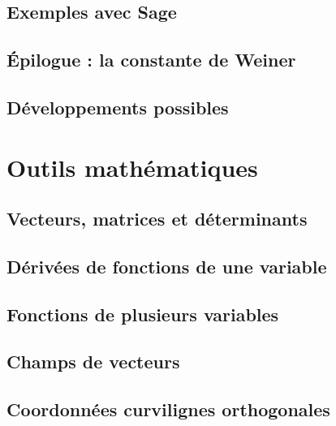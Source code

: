 \documentclass[a4paper,twoside,11pt]{book}
\begin{document}
\chapter{Exemples avec Sage}


\chapter{Épilogue : la constante de Weiner}



\chapter{Développements possibles}



\emptyInputPath
{}
 
\part{Outils mathématiques} 

\chapter{Vecteurs, matrices et déterminants}
    

\chapter{Dérivées de fonctions de une variable}


\chapter{Fonctions de plusieurs variables}


\chapter{Champs de vecteurs}


\chapter{Coordonnées curvilignes orthogonales}

\end{document}
